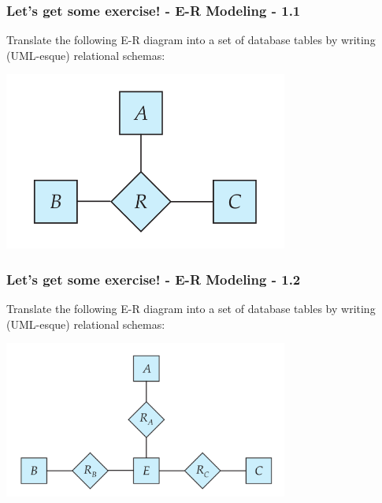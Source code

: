 \begin{frame}
\frametitle{Let's get some exercise! - E-R Modeling - 1.1}

Translate the following E-R diagram into a set of database tables by writing (UML-esque) relational schemas:

\begin{center}
  \includegraphics[width=0.7\textwidth]{images/ternary-relationship.png}
\end{center}

\end{frame}


\begin{frame}
\frametitle{Let's get some exercise! - E-R Modeling - 1.2}

Translate the following E-R diagram into a set of database tables by writing (UML-esque) relational schemas:

\begin{center}
  \includegraphics[width=0.7\textwidth]{images/three-binary-relationships.png}
\end{center}

\end{frame}


